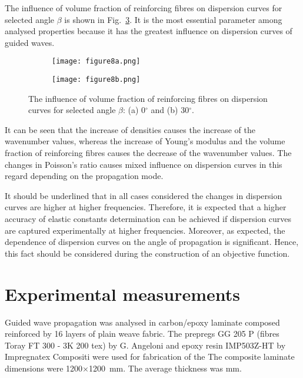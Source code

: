 The influence of volume fraction of reinforcing fibres on dispersion curves for selected 
angle \(\beta\) is shown in Fig.~\ref{fig:vol}. It is the most essential parameter among 
analysed properties because it has the greatest influence on dispersion curves of 
guided waves.


\begin{figure} [h!]
	\centering
		\begin{subfigure}[b]{0.49\textwidth}
		\centering
							\texttt{[image: figure8a.png]}
		\caption{}
		\label{fig:vol0}
	\end{subfigure}
	\hfill
	\begin{subfigure}[b]{0.49\textwidth}
		\centering
								\texttt{[image: figure8b.png]}
		\caption{}
		\label{fig:vol30}
	\end{subfigure}
	
\caption{The influence of volume fraction of reinforcing fibres on dispersion curves 
	for selected angle \(\beta\): (a) 0\(^{\circ}\) and (b) 30\(^{\circ}\).}
 
	\label{fig:vol}
\end{figure}

It can be seen that the increase of densities causes the increase of the wavenumber values, whereas the increase of  Young's modulus and the volume fraction of reinforcing fibres causes the decrease of the wavenumber values. The changes in Poisson's ratio causes mixed influence on dispersion curves in this regard depending on the propagation mode.

It should be underlined that in all cases considered the changes in dispersion curves are higher at higher frequencies. Therefore, it is expected that a higher accuracy of elastic constants determination can be achieved if dispersion curves are captured experimentally at higher frequencies. Moreover, as expected, the dependence of dispersion curves on the angle of propagation is significant. Hence, this fact should be considered during the construction of an objective function.

\section{Experimental measurements \label{sec:experiment}}
Guided wave propagation was analysed in carbon/epoxy laminate composed reinforced 
by 16 layers of plain weave fabric. The prepregs GG 205  P (fibres Toray FT 300 - 3K 
200 tex) by G. Angeloni and epoxy resin IMP503Z-HT by Impregnatex Compositi were 
used for fabrication of the   The composite laminate 
dimensions were 1200\(\times\)1200~mm. The average thickness was   
mm. 

